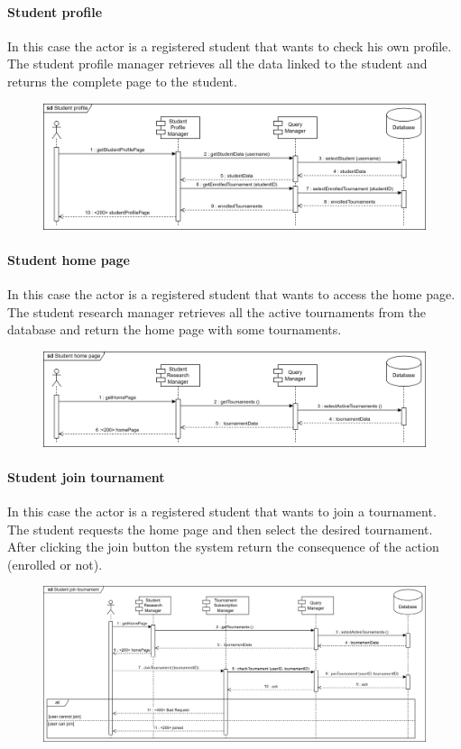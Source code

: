 \documentclass[12pt, a4paper]{report}
\begin{document}
    \paragraph*{Student profile}
    In this case the actor is a registered student that wants to check his own profile. 
    The student profile manager retrieves all the data linked to the student and returns the complete page to the student. 
    \begin{figure}[H]
        \centering
        \includegraphics[width=1.0\linewidth]{images/sprv.png}
    \end{figure}

    \paragraph*{Student home page}
    In this case the actor is a registered student that wants to access the home page. 
    The student research manager retrieves all the active tournaments from the database and return the home page with some tournaments. 
    \begin{figure}[H]
        \centering
        \includegraphics[width=1.0\linewidth]{images/shprv.png}
    \end{figure}

    \paragraph*{Student join tournament}
    In this case the actor is a registered student that wants to join a tournament. 
    The student requests the home page and then select the desired tournament. 
    After clicking the join button the system return the consequence of the action (enrolled or not). 
    \begin{figure}[H]
        \centering
        \includegraphics[width=1.0\linewidth]{images/sjtrv.png}
    \end{figure}
\end{document}
